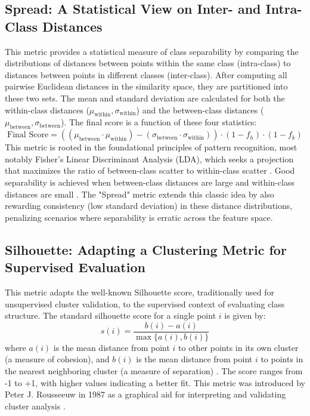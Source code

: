 \documentclass[conference]{IEEEtran}
\begin{document}
\subsection{Spread: A Statistical View on Inter- and Intra-Class Distances}
This metric provides a statistical measure of class separability by comparing the distributions of distances between points within the same class (intra-class) to distances between points in different classes (inter-class). After computing all pairwise Euclidean distances in the similarity space, they are partitioned into these two sets. The mean and standard deviation are calculated for both the within-class distances ($\mu_{\text{within}}, \sigma_{\text{within}}$) and the between-class distances ($\mu_{\text{between}}, \sigma_{\text{between}}$). The final score is a function of these four statistics:
$$ \text{Final Score} = ((\mu_{\text{between}} \cdot \mu_{\text{within}}) - (\sigma_{\text{between}} \cdot \sigma_{\text{within}})) \cdot (1 - f_h) \cdot (1 - f_k) $$
This metric is rooted in the foundational principles of pattern recognition, most notably Fisher's Linear Discriminant Analysis (LDA), which seeks a projection that maximizes the ratio of between-class scatter to within-class scatter \cite{b34}. Good separability is achieved when between-class distances are large and within-class distances are small \cite{b35, b36, b37}. The "Spread" metric extends this classic idea by also rewarding consistency (low standard deviation) in these distance distributions, penalizing scenarios where separability is erratic across the feature space.

\subsection{Silhouette: Adapting a Clustering Metric for Supervised Evaluation}
This metric adapts the well-known Silhouette score, traditionally used for unsupervised cluster validation, to the supervised context of evaluating class structure. The standard silhouette score for a single point $i$ is given by:
\begin{equation}
s(i) = \frac{b(i) - a(i)}{\max\{a(i), b(i)\}}
\end{equation}
where $a(i)$ is the mean distance from point $i$ to other points in its own cluster (a measure of cohesion), and $b(i)$ is the mean distance from point $i$ to points in the nearest neighboring cluster (a measure of separation) \cite{b38}. The score ranges from -1 to +1, with higher values indicating a better fit. This metric was introduced by Peter J. Rousseeuw in 1987 as a graphical aid for interpreting and validating cluster analysis \cite{b38, b39, b40}.
\end{document}
